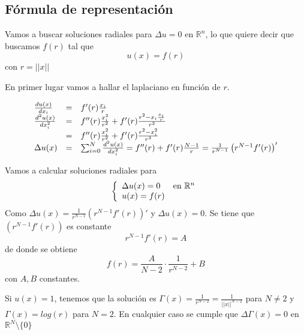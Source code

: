 \subsection{Fórmula de representación}
Vamos a buscar soluciones radiales para $\Delta u = 0$ en $\mathbb{R}^n$, lo que quiere decir que buscamos $f(r)$ tal que
$$u(x) = f(r)$$ con $r=||x||$

En primer lugar vamos a hallar el laplaciano en función de $r$.

\begin{equation*}
\begin{array}{l l l}
\frac{du(x)}{dx_i} & = & f'(r)\frac{x_i}{r}\\
\frac{d^2u(x)}{dx_i^2} & = & f''(r)\frac{x_i^2}{r^2}+f'(r)\frac{r^2-x_i\frac{x_i}{r}}{r^2}\\
& = & f''(r)\frac{x_i^2}{r^2}+f'(r)\frac{r^2-x_i^2}{r^3}\\
\Delta u(x) & = & \sum_{i=0}^N\frac{d^2u(x)}{dx_i^2} = f''(r)+f'(r)\frac{N-1}{r} = \frac{1}{r^{N-1}}\left(r^{N-1}f'(r)\right)'
\end{array}
\end{equation*}

Vamos a calcular soluciones radiales para
\begin{equation*}
\left\{
\begin{array}{l l}
\Delta u(x) = 0 & \text{en } \mathbb{R}^n\\
u(x) = f(r)
\end{array}
\right.
\end{equation*}
Como $\Delta u(x) = \frac{1}{r^{N-1}}\left(r^{N-1}f'(r)\right)'$ y $\Delta u(x) = 0$. Se tiene que $\left(r^{N-1}f'(r)\right)$ es constante
$$r^{N-1}f'(r) = A$$ de donde se obtiene
$$f(r) = \frac{A}{N-2}\cdot \frac{1}{r^{N-2}} + B$$ con $A,B$ constantes.

Si $u(x) = 1$, tenemos que la solución es 
$\Gamma(x) = \frac{1}{r^{N-2}} = \frac{1}{||x||^{N-2}}$ para $N\neq 2$ y $\Gamma(x) = log(r)$ para $N=2$. En cualquier caso se cumple que $\Delta\Gamma(x) = 0$ en $\mathbb{R}^N\setminus\{ 0 \}$

